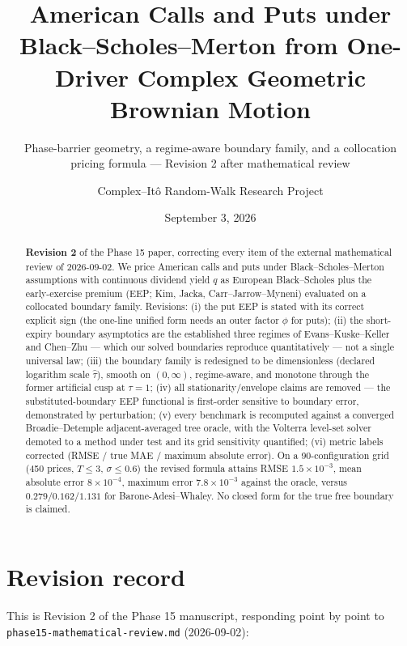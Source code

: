 \documentclass[
  english,
  10pt,
  letterpaper,
  DIV=11,
  numbers=noendperiod]{scrartcl}
\title{American Calls and Puts under Black--Scholes--Merton from
One-Driver Complex Geometric Brownian Motion}
\subtitle{Phase-barrier geometry, a regime-aware boundary family, and a
collocation pricing formula --- Revision 2 after mathematical review}
\author{Complex--Itô Random-Walk Research Project}
\date{September 3, 2026}
\renewcommand*\contentsname{Table of contents}
\newcommand\contentsname{Table of contents}
\begin{document}
\maketitle
\begin{abstract}
\textbf{Revision 2} of the Phase 15 paper, correcting every item of the
external mathematical review of 2026-09-02. We price American calls and
puts under Black--Scholes--Merton assumptions with continuous dividend
yield \(q\) as European Black--Scholes plus the early-exercise premium
(EEP; Kim, Jacka, Carr--Jarrow--Myneni) evaluated on a collocated
boundary family. Revisions: (i) the put EEP is stated with its correct
explicit sign (the one-line unified form needs an outer factor \(\phi\)
for puts); (ii) the short-expiry boundary asymptotics are the
established three regimes of Evans--Kuske--Keller and Chen--Zhu ---
which our solved boundaries reproduce quantitatively --- not a single
universal law; (iii) the boundary family is redesigned to be
dimensionless (declared logarithm scale \(\hat\tau\)), smooth on
\((0,\infty)\), regime-aware, and monotone through the former artificial
cusp at \(\tau=1\); (iv) all stationarity/envelope claims are removed
--- the substituted-boundary EEP functional is first-order sensitive to
boundary error, demonstrated by perturbation; (v) every benchmark is
recomputed against a converged Broadie--Detemple adjacent-averaged tree
oracle, with the Volterra level-set solver demoted to a method under
test and its grid sensitivity quantified; (vi) metric labels corrected
(RMSE / true MAE / maximum absolute error). On a 90-configuration grid
(450 prices, \(T\le3\), \(\sigma\le0.6\)) the revised formula attains
RMSE \(1.5\times10^{-3}\), mean absolute error \(8\times10^{-4}\),
maximum error \(7.8\times10^{-3}\) against the oracle, versus
\(0.279/0.162/1.131\) for Barone-Adesi--Whaley. No closed form for the
true free boundary is claimed.
\end{abstract}

\renewcommand*\contentsname{Table of contents}
{
\setcounter{tocdepth}{1}
\tableofcontents
}

\section{Revision record}\label{sec-revision}

This is Revision 2 of the Phase 15 manuscript, responding point by point
to \texttt{phase15-mathematical-review.md} (2026-09-02):
\end{document}
